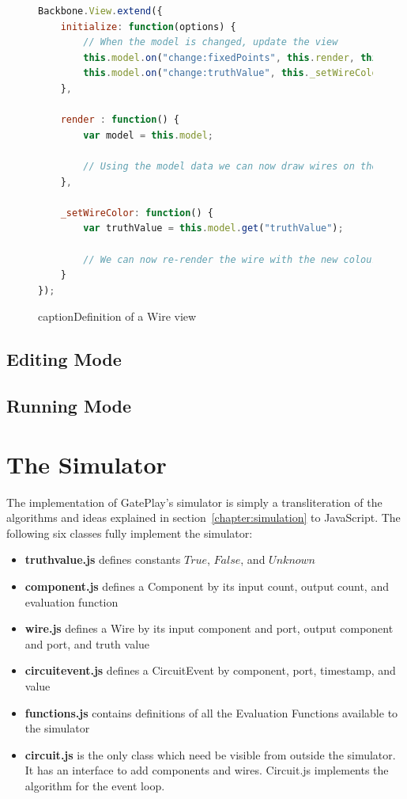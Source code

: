 \begin{figure}
\begin{lstlisting}[language=JavaScript]
Backbone.View.extend({
    initialize: function(options) {
        // When the model is changed, update the view
        this.model.on("change:fixedPoints", this.render, this);
        this.model.on("change:truthValue", this._setWireColor, this);
    },

    render : function() {
        var model = this.model;
		
		// Using the model data we can now draw wires on the canvas
    },

    _setWireColor: function() {
        var truthValue = this.model.get("truthValue");
        
        // We can now re-render the wire with the new colour
    }
});
\end{lstlisting}
caption{Definition of a Wire view}
\label{fig:wireview}
\end{figure}


\subsection{Editing Mode}


\subsection{Running Mode}

\section{The Simulator}
The implementation of GatePlay's simulator is simply a transliteration of the algorithms and ideas explained in section~\ref{chapter:simulation} to JavaScript. The following six classes fully implement the simulator:

\begin{itemize}
	\item \textbf{truthvalue.js} defines constants $True$, $False$, and $Unknown$
	\item \textbf{component.js} defines a Component by its input count, output count, and evaluation function
	\item \textbf{wire.js} defines a Wire by its input component and port, output component and port, and truth value
	\item \textbf{circuitevent.js} defines a CircuitEvent by component, port, timestamp, and value
	\item \textbf{functions.js} contains definitions of all the Evaluation Functions available to the simulator 
	\item \textbf{circuit.js} is the only class which need be visible from outside the simulator. It has an interface to add components and wires. Circuit.js implements the algorithm for the event loop. 
\end{itemize}

